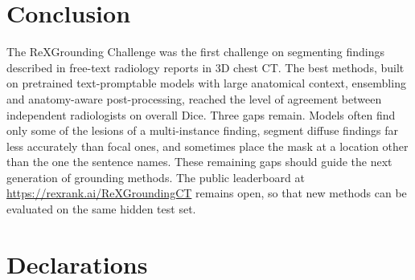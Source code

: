 \documentclass[final,5p,times,twocolumn,authoryear,numafflabel]{elsarticle}
\begin{document}
\section{Conclusion}
\label{sec:conclusion}
The ReXGrounding Challenge was the first challenge on segmenting findings
described in free-text radiology reports in 3D chest CT. The best
methods, built on pretrained text-promptable models with large anatomical
context, ensembling and anatomy-aware post-processing, reached the level of
agreement between independent radiologists on overall Dice. Three gaps remain.
Models often find only some of the lesions of a multi-instance finding, segment
diffuse findings far less accurately than focal ones, and sometimes place the
mask at a location other than the one the sentence names. These remaining gaps should guide the next generation of grounding methods. The public
leaderboard at \url{https://rexrank.ai/ReXGroundingCT} remains open, so that
new methods can be evaluated on the same hidden test set.

\section*{Declarations}
\end{document}
